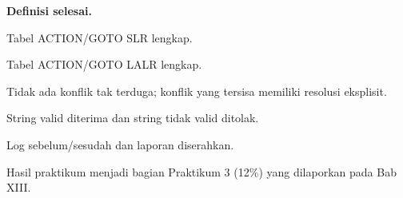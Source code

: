 \textbf{Definisi selesai.}
\begin{checklist}
  \item Tabel ACTION/GOTO SLR lengkap.
  \item Tabel ACTION/GOTO LALR lengkap.
  \item Tidak ada konflik tak terduga; konflik yang tersisa memiliki
        resolusi eksplisit.
  \item String valid diterima dan string tidak valid ditolak.
  \item Log sebelum/sesudah dan laporan diserahkan.
\end{checklist}

Hasil praktikum menjadi bagian Praktikum 3 (12\%) yang dilaporkan
pada Bab XIII.
